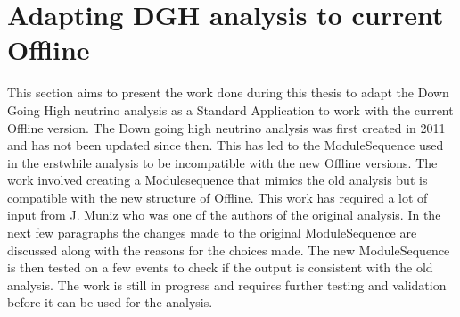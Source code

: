 \chapter{Adapting DGH analysis to current Offline}
\label{sec:app_5}
This section aims to present the work done during this thesis to adapt the Down Going High neutrino analysis as a Standard Application to work with the current Offline version. The Down going high neutrino analysis was first created in 2011 and has not been updated since then. This has led to the ModuleSequence used in the erstwhile analysis to be incompatible with the new Offline versions. The work involved creating a Modulesequence that mimics the old analysis but is compatible with the new structure of Offline. This work has required a lot of input from J. Muniz  who was one of the authors of the original analysis. In the next few paragraphs the changes made to the original ModuleSequence are discussed along with the reasons for the choices made. The new ModuleSequence is then tested on a few events to check if the output is consistent with the old analysis. The work is still in progress and requires further testing and validation before it can be used for the analysis. 

